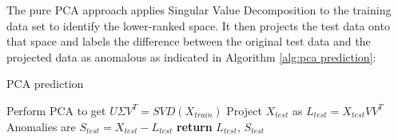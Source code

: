 \documentclass[conference]{IEEEtran}
\begin{document}
The pure PCA approach applies Singular Value Decomposition to  the training data set to identify the lower-ranked space. 
  It then projects the test data onto that space and labels the difference between the original test data and the projected data as anomalous as indicated in Algorithm \ref{alg:pca prediction}:

\begin{algorithm}
\caption{PCA prediction}\label{alg:pca prediction}
\begin{algorithmic}[1]
\State Perform PCA to get $U \Sigma V^T = SVD(X_{train})$
\State Project $X_{test}$ as $L_{test} = X_{test} V V^T$
\State Anomalies are $S_{test} = X_{test} - L_{test}$
\State \textbf{return} $L_{test}$, $S_{test}$
\EndProcedure
\end{algorithmic}
\end{algorithm}
\end{document}
